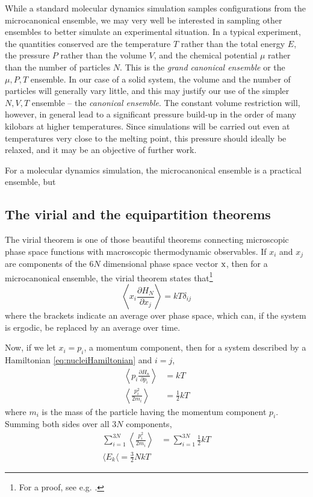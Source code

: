 \documentclass[11pt]{scrbook}   %
\begin{document}
While a standard molecular dynamics simulation samples configurations from the microcanonical ensemble, we may very well be interested in sampling other ensembles to better simulate an experimental situation. 
In a typical experiment, the quantities conserved are the temperature $T$ rather than the total energy $E$, the pressure $P$ rather than the volume $V$, and the chemical potential $\mu$ rather than the number of particles $N$. 
This is the \emph{grand canonical ensemble} or the $\mu,P,T$ ensemble. 
In our case of a solid system, the volume and the number of particles will generally vary little, and this may justify our use of the simpler $N,V,T$ ensemble -- the \emph{canonical ensemble}. 
The constant volume restriction will, however, in general lead to a significant pressure build-up in the order of many kilobars at higher temperatures. 
Since simulations will be carried out even at temperatures very close to the melting point, this pressure should ideally be relaxed, and it may be an objective of further work.





For a molecular dynamics simulation, the microcanonical ensemble is a practical ensemble, but  

\subsection{The virial and the equipartition theorems}

The virial theorem is one of those beautiful theorems connecting microscopic phase space functions with macroscopic thermodynamic observables. 
If $x_i$ and $x_j$ are components of the $6N$ dimensional phase space vector $\mathrm{x}$, 
then for a microcanonical ensemble, the virial theorem states that\footnote{For a proof, see e.g. \cite[81]{Tuckerman:2010}.}
\begin{equation}
  \left\langle x_i \frac{\partial H_N}{\partial x_j}\right\rangle = kT \delta_{ij}
\end{equation}
where the brackets indicate an average over phase space, which can, if the system is ergodic, be replaced by an average over time.

Now, if we let $x_i = p_i$, a momentum component, then for a system described by a Hamiltonian \eqref{eq:nucleiHamiltonian} and $i=j$,
\begin{align}
  \left\langle p_i \frac{\partial H_n}{\partial p_i}\right\rangle &= kT  \\
  \left\langle \frac{p_i^2}{2m_i}\right\rangle &= \frac12kT
\end{align}
where $m_i$ is the mass of the particle having the momentum component $p_i$. 
Summing both sides over all $3N$ components, 
\begin{align}
  \sum_{i=1}^{3N} \left\langle\frac{p_i^2}{2m_i} \right\rangle &= \sum_{i=1}^{3N} \frac12 kT \\
  \langle E_k \langle = \frac32 NkT
\end{align}
\end{document}
